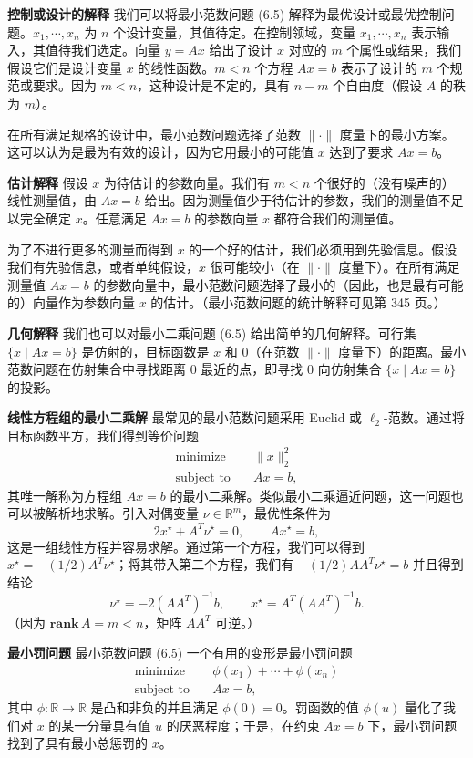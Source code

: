 \documentclass[UTF8, 12pt, fontset=fandol, oneside]{ctexart}
\begin{document}
\noindent\textbf{控制或设计的解释}\quad
我们可以将最小范数问题 (6.5) 解释为最优设计或最优控制问题。$x_1,\cdots,x_n$ 为 $n$ 个设计变量，其值待定。在控制领域，变量 $x_1,\cdots,x_n$ 表示输入，其值待我们选定。向量 $y=Ax$ 给出了设计 $x$ 对应的 $m$ 个属性或结果，我们假设它们是设计变量 $x$ 的线性函数。$m<n$ 个方程 $Ax=b$ 表示了设计的 $m$ 个规范或要求。因为 $m<n$，这种设计是不定的，具有 $n-m$ 个自由度（假设 $A$ 的秩为 $m$）。

在所有满足规格的设计中，最小范数问题选择了范数 $\|\cdot\|$ 度量下的最小方案。这可以认为是最为有效的设计，因为它用最小的可能值 $x$ 达到了要求 $Ax=b$。

\noindent\textbf{估计解释}\quad
假设 $x$ 为待估计的参数向量。我们有 $m<n$ 个很好的（没有噪声的）线性测量值，由 $Ax=b$ 给出。因为测量值少于待估计的参数，我们的测量值不足以完全确定 $x$。任意满足 $Ax=b$ 的参数向量 $x$ 都符合我们的测量值。

为了不进行更多的测量而得到 $x$ 的一个好的估计，我们必须用到先验信息。假设我们有先验信息，或者单纯假设，$x$ 很可能较小（在 $\|\cdot\|$ 度量下）。在所有满足测量值 $Ax=b$ 的参数向量中，最小范数问题选择了最小的（因此，也是最有可能的）向量作为参数向量 $x$ 的估计。（最小范数问题的统计解释可见第 345 页。）

\noindent\textbf{几何解释}\quad
我们也可以对最小二乘问题 (6.5) 给出简单的几何解释。可行集 $\{x\mid Ax=b\}$ 是仿射的，目标函数是 $x$ 和 0（在范数 $\|\cdot\|$ 度量下）的距离。最小范数问题在仿射集合中寻找距离 0 最近的点，即寻找 0 向仿射集合 $\{x\mid Ax=b\}$ 的投影。

\noindent\textbf{线性方程组的最小二乘解}\quad
最常见的最小范数问题采用 Euclid 或 $\ell_2$-范数。通过将目标函数平方，我们得到等价问题
\[
\begin{aligned}
\text{minimize}\quad & \|x\|_2^2\\
\text{subject to}\quad & Ax=b,
\end{aligned}
\]
其唯一解称为方程组 $Ax=b$ 的最小二乘解。类似最小二乘逼近问题，这一问题也可以被解析地求解。引入对偶变量 $\nu\in\mathbb{R}^m$，最优性条件为
\[
2x^\star+A^T\nu^\star=0,\qquad Ax^\star=b,
\]
这是一组线性方程并容易求解。通过第一个方程，我们可以得到 $x^\star=-(1/2)A^T\nu^\star$；将其带入第二个方程，我们有 $-(1/2)AA^T\nu^\star=b$ 并且得到结论
\[
\nu^\star=-2(AA^T)^{-1}b,\qquad x^\star=A^T(AA^T)^{-1}b.
\]
（因为 $\mathbf{rank}\,A=m<n$，矩阵 $AA^T$ 可逆。）

\noindent\textbf{最小罚问题}\quad
最小范数问题 (6.5) 一个有用的变形是最小罚问题
\begin{equation}
\begin{aligned}
\text{minimize}\quad & \phi(x_1)+\cdots+\phi(x_n)\\
\text{subject to}\quad & Ax=b,
\end{aligned}
\tag{6.6}
\end{equation}
其中 $\phi:\mathbb{R}\to\mathbb{R}$ 是凸和非负的并且满足 $\phi(0)=0$。罚函数的值 $\phi(u)$ 量化了我们对 $x$ 的某一分量具有值 $u$ 的厌恶程度；于是，在约束 $Ax=b$ 下，最小罚问题找到了具有最小总惩罚的 $x$。
\end{document}
